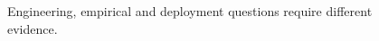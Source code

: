 \begin{figure}[H]
\centering
{}
\caption{Engineering, empirical and deployment questions require different evidence.}\label{fig:teach-M09-00}
\end{figure}
